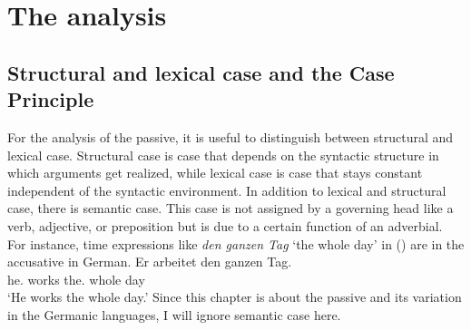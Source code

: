 







\section{The analysis}

\subsection{Structural and lexical case and the Case Principle}
\label{sec-struk-lex-kas}
\label{sec-struc-lex-kas}

For the analysis of the passive, it is useful to distinguish between structural and lexical
case. Structural case is case that depends on the syntactic structure in which arguments get
realized, while lexical case is case that stays constant independent of the syntactic environment. In
addition to lexical and structural case, there is semantic case. This case is not assigned by a
governing head like a verb, adjective, or preposition but is due to a certain function of an
adverbial. For instance, time expressions like \emph{den ganzen Tag} `the whole day' in () are
in the accusative in German.
\ea
\gll Er arbeitet den ganzen Tag.\\
     he.\NOM{} works the.\ACC{} whole day\\\german
\glt `He works the whole day.'
\z
Since this chapter is about the passive and its variation in the Germanic languages, I will ignore
semantic case here.

